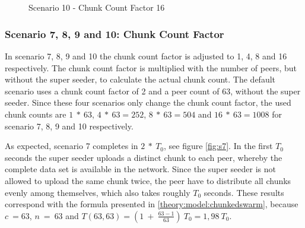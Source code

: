 \pagebreak
\begin{figure}[!ht]
	\begin{center}	
		~ %

	 	~ %

		\caption{Scenario 10 - Chunk Count Factor 16}
		\label{fig:s10}
	\end{center}
\end{figure}
\vfill

\pagebreak
\subsubsection{Scenario 7, 8, 9 and 10: Chunk Count Factor}

In scenario 7, 8, 9 and 10 the chunk count factor is adjusted to 1, 4, 8 and 16 respectively. The chunk count factor is multiplied with the number of peers, but without the super seeder, to calculate the actual chunk count. The default scenario uses a chunk count factor of 2 and a peer count of 63, without the super seeder. Since these four scenarios only change the chunk count factor, the used chunk counts are $1\:*\:63$, $4\:*\:63=252$, $8\:*\:63=504$ and $16\:*\:63=1008$ for scenario 7, 8, 9 and 10 respectively.   

As expected, scenario 7 completes in $2\:*\:T_0$, see figure \ref{fig:s7}. In the first $T_0$ seconds the super seeder uploads a distinct chunk to each peer, whereby the complete data set is available in the network. Since the super seeder is not allowed to upload the same chunk twice, the peer have to distribute all chunks evenly among themselves, which also takes roughly $T_0$ seconds. These results correspond with the formula presented in \ref{theory:model:chunkedswarm}, because $c\:=63$, $n\:=\:63$ and $T(63, 63) = (1\:+\:\frac{63-1}{63})\:T_0 = 1,98\:T_0$.

